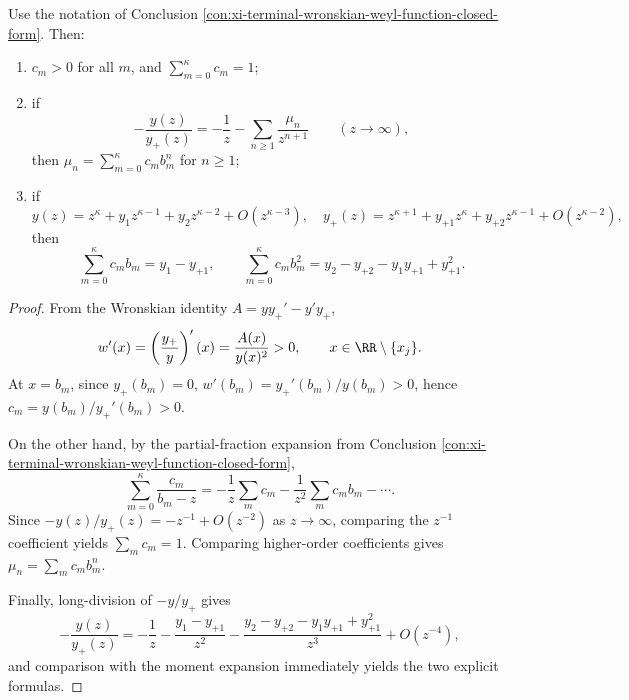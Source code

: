 \begin{conclusion}\label{con:xi-terminal-wronskian-spectral-weights-moment-identities}
Use the notation of Conclusion \ref{con:xi-terminal-wronskian-weyl-function-closed-form}.
Then:
\begin{enumerate}
  \item \(c_m>0\) for all \(m\), and \(\sum_{m=0}^{\kappa}c_m=1\);
  \item if
  \[
  -\frac{y(z)}{y_{+}(z)}=-\frac{1}{z}-\sum_{n\ge 1}\frac{\mu_n}{z^{n+1}}
  \qquad (z\to\infty),
  \]
  then \(\mu_n=\sum_{m=0}^{\kappa}c_m b_m^{n}\) for \(n\ge 1\);
  \item if
  \[
  y(z)=z^{\kappa}+y_1 z^{\kappa-1}+y_2 z^{\kappa-2}+O(z^{\kappa-3}),\quad
  y_{+}(z)=z^{\kappa+1}+y_{+1}z^{\kappa}+y_{+2}z^{\kappa-1}+O(z^{\kappa-2}),
  \]
  then
  \[
  \sum_{m=0}^{\kappa}c_m b_m=y_1-y_{+1},\qquad
  \sum_{m=0}^{\kappa}c_m b_m^{2}=y_2-y_{+2}-y_1y_{+1}+y_{+1}^{2}.
  \]
\end{enumerate}
\end{conclusion}
\begin{proof}[Proof]
From the Wronskian identity \(A=yy_{+}'-y'y_{+}\),
\[
w'(x)=\left(\frac{y_{+}}{y}\right)'(x)=\frac{A(x)}{y(x)^2}>0,
\qquad x\in\RR\setminus\{x_j\}.
\]
At \(x=b_m\), since \(y_{+}(b_m)=0\),
\(
w'(b_m)=y_{+}'(b_m)/y(b_m)>0
\), hence \(c_m=y(b_m)/y_{+}'(b_m)>0\).

On the other hand, by the partial-fraction expansion from Conclusion \ref{con:xi-terminal-wronskian-weyl-function-closed-form},
\[
\sum_{m=0}^{\kappa}\frac{c_m}{b_m-z}
=-\frac{1}{z}\sum_{m}c_m-\frac{1}{z^2}\sum_{m}c_m b_m-\cdots .
\]
Since \(-y(z)/y_{+}(z)=-z^{-1}+O(z^{-2})\) as \(z\to\infty\), comparing the \(z^{-1}\) coefficient yields \(\sum_m c_m=1\).
Comparing higher-order coefficients gives \(\mu_n=\sum_m c_m b_m^n\).

Finally, long-division of \(-y/y_{+}\) gives
\[
-\frac{y(z)}{y_{+}(z)}
=-\frac{1}{z}-\frac{y_1-y_{+1}}{z^2}
-\frac{y_2-y_{+2}-y_1y_{+1}+y_{+1}^2}{z^3}+O(z^{-4}),
\]
and comparison with the moment expansion immediately yields the two explicit formulas.
\end{proof}

\endinput